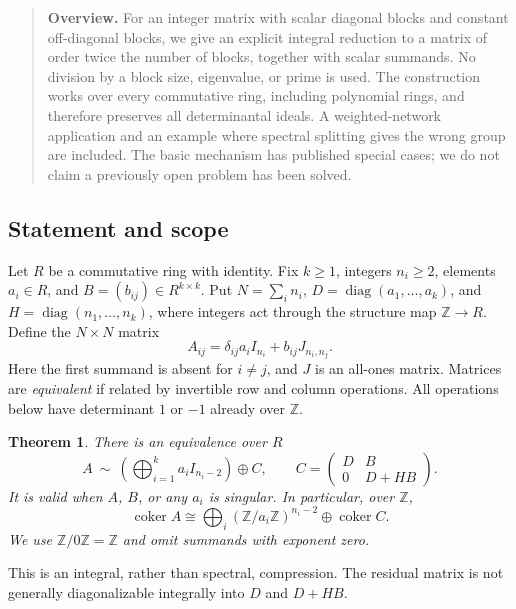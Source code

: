 \documentclass[11pt,a4paper]{article}
\newtheorem{theorem}{Theorem}[section]
\theoremstyle{definition}\newtheorem{definition}[theorem]{Definition}
\theoremstyle{remark}\newtheorem{remark}[theorem]{Remark}
\newcommand{\Z}{\mathbb Z}\newcommand{\Q}{\mathbb Q}\newcommand{\F}{\mathbb F}
\DeclareMathOperator{\coker}{coker}\DeclareMathOperator{\diag}{diag}\DeclareMathOperator{\rank}{rank}
\numberwithin{equation}{section}
\begin{document}
\begin{quote}\small\textbf{Overview.} For an integer matrix with scalar diagonal blocks and constant off-diagonal blocks, we give an explicit integral reduction to a matrix of order twice the number of blocks, together with scalar summands. No division by a block size, eigenvalue, or prime is used. The construction works over every commutative ring, including polynomial rings, and therefore preserves all determinantal ideals. A weighted-network application and an example where spectral splitting gives the wrong group are included. The basic mechanism has published special cases; we do not claim a previously open problem has been solved.\end{quote}

\subsection{Statement and scope}\label{K01-sec-1}
Let $R$ be a commutative ring with identity. Fix $k\geq1$, integers $n_i\geq2$, elements $a_i\in R$, and $B=(b_{ij})\in R^{k\times k}$. Put $N=\sum_i n_i$, $D=\diag(a_1,\ldots,a_k)$, and $H=\diag(n_1,\ldots,n_k)$, where integers act through the structure map $\Z\to R$. Define the $N\times N$ matrix
\[
 A_{ij}=\delta_{ij}a_iI_{n_i}+b_{ij}J_{n_i,n_j}.
\]
Here the first summand is absent for $i\ne j$, and $J$ is an all-ones matrix. Matrices are \emph{equivalent} if related by invertible row and column operations. All operations below have determinant $1$ or $-1$ already over $\Z$.
\begin{theorem}\label{K01-main}
There is an equivalence over $R$
\[
 A\ \sim\ \left(\bigoplus_{i=1}^k a_iI_{n_i-2}\right)\oplus C,
 \qquad C=\begin{pmatrix}D&B\\0&D+HB\end{pmatrix}.                 \tag{K01.1}
\]
It is valid when $A$, $B$, or any $a_i$ is singular. In particular, over $\Z$,
\[
 \coker A\cong \bigoplus_i(\Z/a_i\Z)^{n_i-2}\oplus\coker C.       \tag{K01.2}
\]
We use $\Z/0\Z=\Z$ and omit summands with exponent zero.
\end{theorem}
This is an integral, rather than spectral, compression. The residual matrix is not generally diagonalizable integrally into $D$ and $D+HB$.
\end{document}
